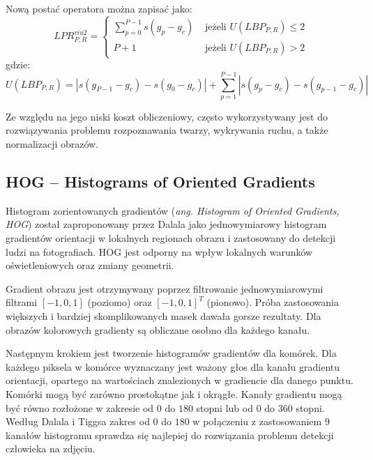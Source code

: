 Nową postać operatora można zapisać jako:
\begin{equation} 
\label{lbp_lbp_riu2} 
LPR_{P, R}^{riu2} = 
	\begin{cases}
		\sum\limits_{p=0}^{P-1} s(g_p - g_c) & \text{ jeżeli } U(LBP_{P, R}) \leq 2 \\
		P + 1 & \text{ jeżeli } U(LBP_{P, R}) > 2
	\end{cases}
\end{equation} gdzie: \begin{equation} 
\label{lbp_u_lbp} 
U(LBP_{P, R}) = | s(g_{P-1} - g_c) -s(g_0 - g_c) | + \sum\limits_{p=1}^{P-1} | s(g_p - g_c) - s(g_{p-1} - g_c) |
\end{equation}

Ze względu na jego niski koszt obliczeniowy, często wykorzystywany jest do rozwiązywania problemu rozpoznawania twarzy\cite{AHONEN04}\cite{HEUSCH06}\cite{MATURANA09}, wykrywania ruchu\cite{HEIKKILA04}, a także normalizacji obrazów\cite{JUST06}.


\subsection{HOG -- Histograms of Oriented Gradients}

Histogram zorientowanych gradientów (\emph{ang. Histogram of Oriented Gradients, HOG}) został zaproponowany przez Dalala jako jednowymiarowy histogram gradientów orientacji w lokalnych regionach obrazu i zastosowany do detekcji ludzi na fotografiach.\cite{DALAL05} HOG jest odporny na wpływ lokalnych warunków oświetleniowych oraz zmiany geometrii.\cite{YAMAUCHI11}

Gradient obrazu jest otrzymywany poprzez filtrowanie jednowymiarowymi filtrami $[-1, 0, 1]$ (poziomo) oraz $[-1, 0, 1]^T$ (pionowo). Próba zastosowania większych i bardziej skomplikowanych masek dawała gorsze rezultaty. Dla obrazów kolorowych gradienty są obliczane osobno dla każdego kanału.

Następnym krokiem jest tworzenie histogramów gradientów dla komórek. Dla każdego piksela w komórce wyznaczany jest ważony głos dla kanału gradientu orientacji, opartego na wartościach znalezionych w gradiencie dla danego punktu. Komórki mogą być zarówno prostokątne jak i okrągłe. Kanały gradientu mogą być równo rozłożone w zakresie od $0$ do $180$ stopni lub od $0$ do $360$ stopni. Według Dalala i Tiggsa zakres od $0$ do $180$ w połączeniu z zastosowaniem 9 kanałów histogramu sprawdza się najlepiej do rozwiązania problemu detekcji człowieka na zdjęciu.

